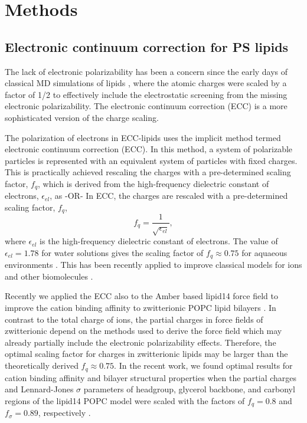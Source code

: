 \documentclass[journal=jpcbfk,manuscript=article]{achemso}
\begin{document}


 
\section{Methods} 
 
\subsection{Electronic continuum correction for PS lipids}\label{section:ecc} 

The lack of electronic polarizability has been a concern since the
early days of classical MD simulations of lipids \cite{jonsson86,egberts94, berendsen1996},
where the atomic charges were scaled by a factor of 1/2 to effectively
include the electrostatic screening from the missing electronic polarizability.
The electronic continuum correction (ECC) is a more sophisticated version of the charge scaling.

The polarization of electrons in ECC-lipids uses the implicit method termed electronic continuum correction (ECC). \cite{leontyev09, Pluharova2014, martinek17, melcr18} 
In this method, a system of polarizable particles is represented with an equivalent system of particles with fixed charges. 
This is practically achieved rescaling the charges with a pre-determined scaling factor, $f_q$,
which is derived from the high-frequency dielectric constant of electrons, $\epsilon_{el}$, as
-OR-
In ECC, the charges are rescaled with a pre-determined scaling factor, $f_q$,
\begin{equation}
  f_q = \frac{1}{\sqrt{\epsilon_{el}}} ,
\end{equation}
where $\epsilon_{el}$ is the high-frequency dielectric constant of electrons.
The value of $\epsilon_{el} = 1.78$ for water solutions gives the scaling
factor of $f_q \approx 0.75$ for aquaeous environments \cite{leontyev09}.
This has been recently applied to improve classical models for ions and
other biomolecules \cite{Pluharova2014, martinek17, melcr18}
.

Recently we applied the ECC also to the Amber based lipid14 force field \cite{dickson14} to
improve the cation binding affinity to zwitterionic POPC lipid bilayers \cite{melcr18}.
In contrast to the total charge of ions, the partial charges in force fields of zwitterionic
depend on the methods used to derive the force field which may already partially include the
electronic polarizability effects. Therefore, the optimal scaling factor for charges in
zwitterionic lipids may be larger than the theoretically derived $f_q \approx 0.75$.
In the recent work, we found optimal results for cation binding affinity and
bilayer structural properties when the partial charges and Lennard-Jones $\sigma$
parameters of headgroup, glycerol backbone, and carbonyl regions of the lipid14 POPC model
were scaled with the factors of $f_q = 0.8$ and $f_\sigma = 0.89$, respectively \cite{melcr18}.
\end{document}
